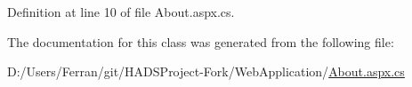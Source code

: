 Definition at line 10 of file About.\+aspx.\+cs.



The documentation for this class was generated from the following file\+:\begin{DoxyCompactItemize}
\item 
D\+:/\+Users/\+Ferran/git/\+H\+A\+D\+S\+Project-\/\+Fork/\+Web\+Application/\mbox{\hyperlink{About_8aspx_8cs}{About.\+aspx.\+cs}}\end{DoxyCompactItemize}
